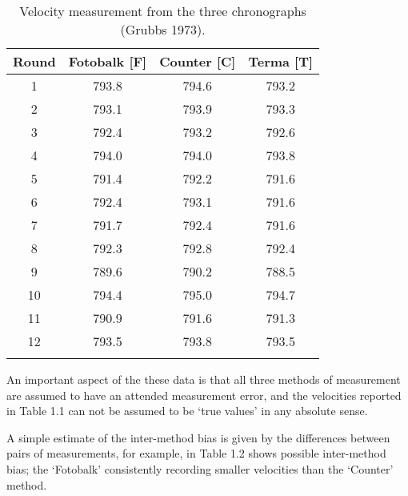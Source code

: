 \documentclass[12pt, a4paper]{report}
\theoremstyle{plain}
\theoremstyle{definition}
\theoremstyle{remark}
\begin{document}
	
	\begin{table}[ht]
		\begin{center}
			\begin{tabular}{cccc}
				\hline
				Round& Fotobalk [F] & Counter [C]& Terma [T]\\
				\hline
				1 & 793.8 & 794.6 & 793.2 \\
				2 & 793.1 & 793.9 & 793.3 \\
				3 & 792.4 & 793.2 & 792.6 \\
				4 & 794.0 & 794.0 & 793.8 \\
				5 & 791.4 & 792.2 & 791.6 \\
				6 & 792.4 & 793.1 & 791.6 \\
				7 & 791.7 & 792.4 & 791.6 \\
				8 & 792.3 & 792.8 & 792.4 \\
				9 & 789.6 & 790.2 & 788.5 \\
				10 & 794.4 & 795.0 & 794.7 \\
				11 & 790.9 & 791.6 & 791.3 \\
				12 & 793.5 & 793.8 & 793.5 \\
			\phantom{makespace} & \phantom{makespace} & \phantom{makespace} & \phantom{makespace} \\
			\end{tabular}
			\caption{Velocity measurement from the three chronographs (Grubbs
				1973).}
		\end{center}
		\label{FCTdata}
	\end{table}
	
	An important aspect of the these data is that all three methods of
	measurement are assumed to have an attended measurement error, and
	the velocities reported in Table 1.1 can not be assumed to be
	`true values' in any absolute sense.
	
	 A simple estimate of the
	inter-method bias is given by the differences between pairs of measurements, for example, in Table 1.2 shows possible inter-method bias; the `Fotobalk' consistently recording
	smaller velocities than the `Counter' method. 
	
\end{document}
